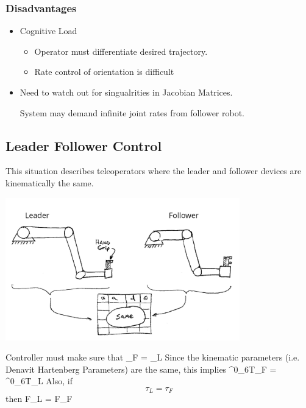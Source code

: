  

\subsubsection*{Disadvantages}
\begin{itemize}
   \item Cognitive Load
           \begin{itemize}
                 \item Operator must differentiate desired trajectory.
		 \item Rate control of orientation is difficult
            \end{itemize}
   \item Need to watch out for singualrities in Jacobian Matrices.

System may demand infinite joint rates from follower robot.
\end{itemize}






\subsection{Leader Follower Control}

This situation describes teleoperators where the leader and follower devices are kinematically the same.

\includegraphics[width=4.0in]{figs14/00401.jpg}

Controller must make sure that
\bq
\theta_F = \theta_L
\eq
Since the kinematic parameters (i.e. Denavit Hartenberg Parameters) are the same, this implies
\bq
^0_6T_F = ^0_6T_L
\eq
Also, if
\[
\tau_L = \tau_F
\]
then
\bq
F_L = F_F
\eq

